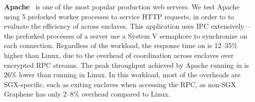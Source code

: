 


{\bf Apache}~\cite{apache} is one of the most popular production web servers. We test Apache using 5 preforked worker processes to service HTTP requests,
in order to 
to evaluate the efficiency of \graphenesgx{} across enclaves.
This application uses IPC extensively---the preforked processes of a server use a System V semaphore to synchronize on each connection.
Regardless of the workload, the response time on \graphenesgx{} is 12--35\% higher than Linux, due to the overhead of coordination across enclaves over encrypted RPC streams.
The peak throughput achieved by Apache running in \graphenesgx{} is 26\% lower than running in Linux.
In this workload, most of the overheads are SGX-specific, such as exiting enclaves when accessing the RPC, as non-SGX Graphene
has only 2--8\% overhead compared to Linux.



